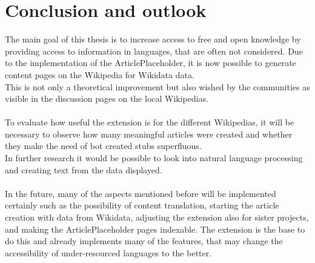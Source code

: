 \chapter{Conclusion and outlook}

The main goal of this thesis is to increase access to free and open knowledge by providing access to information in languages, that are often not considered. Due to the implementation of the ArticlePlaceholder, it is now possible to generate content pages on the Wikipedia for Wikidata data. \\
This is not only a theoretical improvement but also wished by the communities as visible in the discussion pages on the local Wikipedias. \\
\\
To evaluate how useful the extension is for the different Wikipedias, it will be necessary to observe how many meaningful articles were created and whether they make the need of bot created stubs superfluous. \\
In further research it would be possible to look into natural language processing and creating text from the data displayed. \\
\\
In the future, many of the aspects mentioned before will be implemented certainly such as the possibility of content translation, starting the article creation with data from Wikidata, adjusting the extension also for sister projects, and making the ArticlePlaceholder pages indexable. The extension is the base to do this and already implements many of the features, that may change the accessibility of under-resourced languages to the better.

